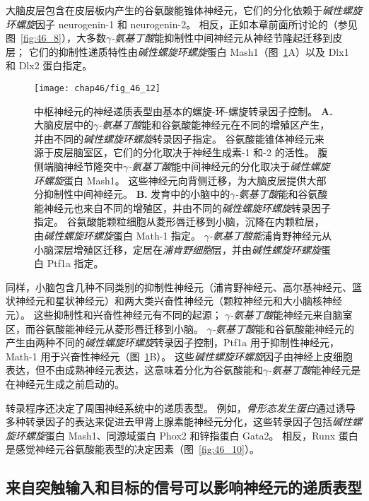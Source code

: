大脑皮层包含在皮层板内产生的谷氨酸能锥体神经元，它们的分化依赖于\textit{碱性螺旋环螺旋}因子 neurogenin-1 和 neurogenin-2。
相反，正如本章前面所讨论的（参见图~\ref{fig:46_8}），大多数\textit{$\gamma$-氨基丁酸}能抑制性中间神经元从神经节隆起迁移到皮层；
它们的抑制性递质特性由\textit{碱性螺旋环螺旋}蛋白 Mash1（图~\ref{fig:46_12}A）以及 Dlx1 和 Dlx2 蛋白指定。


\begin{figure}[htbp]
	\centering
	\texttt{[image: chap46/fig\_46\_12]}
	\caption{中枢神经元的神经递质表型由基本的螺旋-环-螺旋转录因子控制。
		\textbf{A.} 大脑皮层中的\textit{$\gamma$-氨基丁酸}能和谷氨酸能神经元在不同的增殖区产生，并由不同的\textit{碱性螺旋环螺旋}转录因子指定。
		谷氨酸能锥体神经元来源于皮层脑室区，它们的分化取决于神经生成素-1 和-2 的活性。
		腹侧端脑神经节隆突中\textit{$\gamma$-氨基丁酸}能中间神经元的分化取决于\textit{碱性螺旋环螺旋}蛋白 Mash1。
		这些神经元向背侧迁移，为大脑皮层提供大部分抑制性中间神经元。
		\textbf{B.} 发育中的小脑中的\textit{$\gamma$-氨基丁酸}能和谷氨酸能神经元也来自不同的增殖区，并由不同的\textit{碱性螺旋环螺旋}转录因子指定。
		谷氨酸能颗粒细胞从菱形唇迁移到小脑，沉降在内颗粒层，由\textit{碱性螺旋环螺旋}蛋白 Math-1 指定。
		\textit{$\gamma$-氨基丁酸能}浦肯野神经元从小脑深层增殖区迁移，定居在\textit{浦肯野细胞}层，并由\textit{碱性螺旋环螺旋}蛋白 Ptf1a 指定。}
	\label{fig:46_12}
\end{figure}


同样，小脑包含几种不同类别的抑制性神经元（浦肯野神经元、高尔基神经元、篮状神经元和星状神经元）和两大类兴奋性神经元（颗粒神经元和大小脑核神经元）。
这些抑制性和兴奋性神经元有不同的起源；
\textit{$\gamma$-氨基丁酸}能神经元来自脑室区，而谷氨酸能神经元从菱形唇迁移到小脑。
\textit{$\gamma$-氨基丁酸}能和谷氨酸能神经元的产生由两种不同的\textit{碱性螺旋环螺旋}转录因子控制，Ptf1a 用于抑制性神经元，Math-1 用于兴奋性神经元（图~\ref{fig:46_12}B）。
这些\textit{碱性螺旋环螺旋}因子由神经上皮细胞表达，但不由成熟神经元表达，这意味着分化为谷氨酸能和\textit{$\gamma$-氨基丁酸}能神经元是在神经元生成之前启动的。


转录程序还决定了周围神经系统中的递质表型。
例如，\textit{骨形态发生蛋白}通过诱导多种转录因子的表达来促进去甲肾上腺素能神经元分化，这些转录因子包括\textit{碱性螺旋环螺旋}蛋白 Mash1、同源域蛋白 Phox2 和锌指蛋白 Gata2。
相反，Runx 蛋白是感觉神经元谷氨酸能表型的决定因素（图~\ref{fig:46_10}）。



\subsection{来自突触输入和目标的信号可以影响神经元的递质表型}

